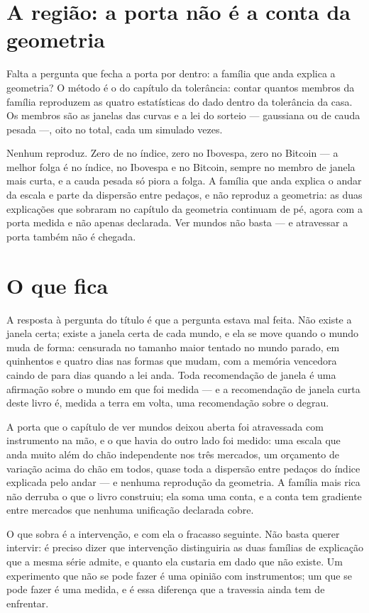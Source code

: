 \section{A região: a porta não é a conta da geometria}

Falta a pergunta que fecha a porta por dentro: a família que anda explica a geometria? O método
é o do capítulo da tolerância: contar quantos membros da família reproduzem as quatro estatísticas
do dado dentro da tolerância da casa. Os membros são as janelas das curvas e a lei do sorteio ---
gaussiana ou de cauda pesada ---, oito no total, cada um simulado \numJanelaMundosRegiao{} vezes.

Nenhum reproduz. Zero de \numJanelaRegiaoSpTentados{} no índice, zero no Ibovespa, zero no
Bitcoin --- a melhor folga é \numJanelaRegiaoSpFolgaSessentaTresNormal{} no índice,
\numJanelaRegiaoIbovFolgaSessentaTresNormal{} no Ibovespa e
\numJanelaRegiaoBtcFolgaSessentaTresNormal{} no Bitcoin, sempre no membro de janela mais curta, e
a cauda pesada só piora a folga. A família que anda explica o andar da escala e parte da
dispersão entre pedaços, e não reproduz a geometria: as duas explicações que sobraram no capítulo
da geometria continuam de pé, agora com a porta medida e não apenas declarada. Ver mundos não
basta --- e atravessar a porta também não é chegada.

\section{O que fica}

A resposta à pergunta do título é que a pergunta estava mal feita. Não existe a janela certa;
existe a janela certa de cada mundo, e ela se move quando o mundo muda de forma: censurada no
tamanho maior tentado no mundo parado, em quinhentos e quatro dias nas formas que mudam, com a
memória vencedora caindo de \numJanelaParadoMemoriaVencedora{} para
\numJanelaAndandoMemoriaVencedora{} dias quando a lei anda. Toda recomendação de janela é uma
afirmação sobre o mundo em que foi medida --- e a recomendação de janela curta deste livro é,
medida a terra em volta, uma recomendação sobre o degrau.

A porta que o capítulo de ver mundos deixou aberta foi atravessada com instrumento na mão, e o
que havia do outro lado foi medido: uma escala que anda muito além do chão independente nos três
mercados, um orçamento de variação acima do chão em todos, quase toda a dispersão entre pedaços do
índice explicada pelo andar --- e nenhuma reprodução da geometria. A família mais rica não derruba
o que o livro construiu; ela soma uma conta, e a conta tem gradiente entre mercados que nenhuma
unificação declarada cobre.

O que sobra é a intervenção, e com ela o fracasso seguinte. Não basta querer intervir: é preciso
dizer que intervenção distinguiria as duas famílias de explicação que a mesma série admite, e
quanto ela custaria em dado que não existe. Um experimento que não se pode fazer é uma opinião com
instrumentos; um que se pode fazer é uma medida, e é essa diferença que a travessia ainda tem de
enfrentar.
